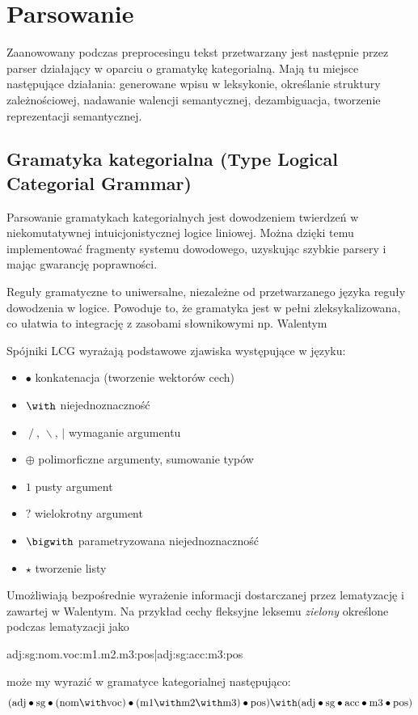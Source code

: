 \documentclass[oneside,pwrcover,withmarginpar,hidelinks,11pt]{article}
\newcommand{\tensor}{\bullet}
\newcommand{\forward}{\operatorname{/}}
\newcommand{\backward}{\operatorname{\backslash}}
\newcommand{\both}{\mid}
\newcommand{\plus}{\oplus}
\newcommand{\maybe}{?}
\newcommand{\one}{1}
\begin{document}
\section{Parsowanie}
Zaanowowany podczas preprocesingu tekst przetwarzany jest następnie przez 
parser działający w oparciu o gramatykę kategorialną.
Mają tu miejsce następujące działania:
generowane wpisu w leksykonie, określanie struktury zależnościowej, 
nadawanie walencji semantycznej, dezambiguacja, tworzenie reprezentacji semantycznej. 

\subsection{Gramatyka kategorialna (Type Logical Categorial Grammar)}
Parsowanie gramatykach kategorialnych jest dowodzeniem twierdzeń w niekomutatywnej intuicjonistycznej logice liniowej.
Można dzięki temu implementować fragmenty systemu dowodowego, uzyskując szybkie parsery i mając gwarancję poprawności.

Reguły gramatyczne to uniwersalne, niezależne od przetwarzanego języka reguły dowodzenia w logice.
Powoduje to, że gramatyka jest w pełni zleksykalizowana, 
co ułatwia to integrację z zasobami słownikowymi np. Walentym

Spójniki LCG wyrażają podstawowe zjawiska występujące w języku:
\begin{itemize}
\item $\tensor$ konkatenacja (tworzenie wektorów cech)
\item $\with$ niejednoznaczność
\item $\forward$, $\backward$, $\both$ wymaganie argumentu
\item $\plus$ polimorficzne argumenty, sumowanie typów
\item $\one$ pusty argument
\item $\maybe$ wielokrotny argument
\item $\bigwith$ parametryzowana niejednoznaczność
\item $\star$ tworzenie listy
\end{itemize}
Umożliwiają bezpośrednie wyrażenie informacji dostarczanej przez lematyzację i zawartej w Walentym.
Na przykład cechy fleksyjne leksemu {\it zielony} określone podczas lematyzacji jako
\begin{center}
adj:sg:nom.voc:m1.m2.m3:pos|adj:sg:acc:m3:pos
\end{center}
może my wyrazić w gramatyce kategorialnej następująco:
\[(\text{adj}\tensor\text{sg}\tensor(\text{nom}\with\text{voc})\tensor(\text{m1}\with\text{m2}\with\text{m3})\tensor\text{pos})\with
(\text{adj}\tensor\text{sg}\tensor\text{acc}\tensor\text{m3}\tensor\text{pos})\]
\end{document}
